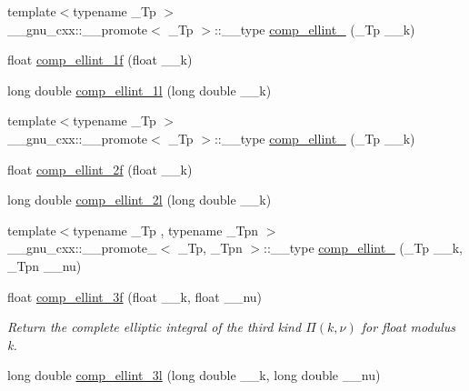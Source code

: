 \begin{DoxyCompactItemize}
\item 
{\footnotesize template$<$typename \+\_\+\+Tp $>$ }\\\+\_\+\+\_\+gnu\+\_\+cxx\+::\+\_\+\+\_\+promote$<$ \+\_\+\+Tp $>$\+::\+\_\+\+\_\+type \hyperlink{group__tr29124__math__spec__func_gac559500c604c43ea943d593c9ad9d289}{comp\+\_\+ellint\+\_} (\+\_\+\+Tp \+\_\+\+\_\+k)
\item 
float \hyperlink{group__tr29124__math__spec__func_ga7fb5be999a8125cf7e55e630eb8444a1}{comp\+\_\+ellint\+\_\+1f} (float \+\_\+\+\_\+k)
\item 
long double \hyperlink{group__tr29124__math__spec__func_ga7247d3dd77c1ff5df3c059fed862dc48}{comp\+\_\+ellint\+\_\+1l} (long double \+\_\+\+\_\+k)
\item 
{\footnotesize template$<$typename \+\_\+\+Tp $>$ }\\\+\_\+\+\_\+gnu\+\_\+cxx\+::\+\_\+\+\_\+promote$<$ \+\_\+\+Tp $>$\+::\+\_\+\+\_\+type \hyperlink{group__tr29124__math__spec__func_ga22fcc678829f0daf2de257896378e7e0}{comp\+\_\+ellint\+\_} (\+\_\+\+Tp \+\_\+\+\_\+k)
\item 
float \hyperlink{group__tr29124__math__spec__func_ga21700f2f125c42b1f1da1f9c7eea1135}{comp\+\_\+ellint\+\_\+2f} (float \+\_\+\+\_\+k)
\item 
long double \hyperlink{group__tr29124__math__spec__func_ga47b647ec386c8d4b18a030c97842df18}{comp\+\_\+ellint\+\_\+2l} (long double \+\_\+\+\_\+k)
\item 
{\footnotesize template$<$typename \+\_\+\+Tp , typename \+\_\+\+Tpn $>$ }\\\+\_\+\+\_\+gnu\+\_\+cxx\+::\+\_\+\+\_\+promote\+\_$<$ \+\_\+\+Tp, \+\_\+\+Tpn $>$\+::\+\_\+\+\_\+type \hyperlink{group__tr29124__math__spec__func_gad833404645e24b7f0598a640ff92d623}{comp\+\_\+ellint\+\_} (\+\_\+\+Tp \+\_\+\+\_\+k, \+\_\+\+Tpn \+\_\+\+\_\+nu)
\item 
float \hyperlink{group__tr29124__math__spec__func_ga76834d3112f777703330892303267a39}{comp\+\_\+ellint\+\_\+3f} (float \+\_\+\+\_\+k, float \+\_\+\+\_\+nu)
\begin{DoxyCompactList}\small\item\em Return the complete elliptic integral of the third kind $ \Pi(k,\nu) $ for {\ttfamily float} modulus {\ttfamily k}. \end{DoxyCompactList}\item 
long double \hyperlink{group__tr29124__math__spec__func_ga1ca081fee102cd0d4d6b091285e495e5}{comp\+\_\+ellint\+\_\+3l} (long double \+\_\+\+\_\+k, long double \+\_\+\+\_\+nu)

\end{DoxyCompactItemize}
